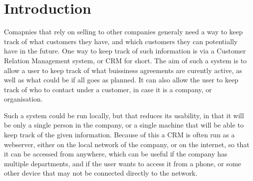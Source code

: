 \chapter{Introduction}
\label{chap:Introduction}
Comapnies that rely on selling to other companies generaly need a way to keep track of
what customers they have, and which customers they can potentially have in the future.
One way to keep track of such information is via a Customer Relation Management system,
or CRM for short. The aim of such a system is to allow a user to keep track of what
buissiness agreements are curently active, as well as what could be if all goes as planned.
It can also allow the user to keep track of who to contact under a customer, in case it is
a company, or organisation.

Such a system could be run locally, but that reduces its usability, in that it will
be only a single person in the company, or a single machine that will be able to keep
track of the given information. Because of this a CRM is often run as a webserver, either
on the local network of the company, or on the internet, so that it can be accessed
from anywhere, which can be useful if the company has multiple departments, and if the
user wants to access it from a phone, or some other device that may not be connected
directly to the network.



